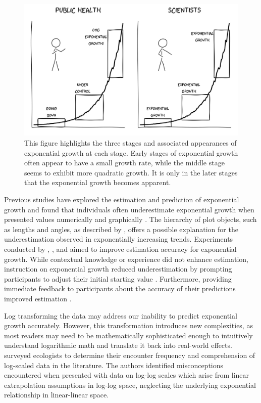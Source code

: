 \documentclass[12pt]{article}
\begin{document}
\begin{figure}[tbp]

{\centering \includegraphics[width=1\linewidth,]{images/exponential-stages-comic} 

}

\caption{This figure highlights the three stages and associated appearances of exponential growth at each stage. Early stages of exponential growth often appear to have a small growth rate, while the middle stage seems to exhibit more quadratic growth. It is only in the later stages that the exponential growth becomes apparent.}\label{fig:exponential-stages}
\end{figure}

Previous studies have explored the estimation and prediction of
exponential growth and found that individuals often underestimate
exponential growth when presented values numerically and graphically
\citep{wagenaar_misperception_1975}. The hierarchy of plot objects, such
as lengths and angles, as described by \citet{cleveland_graphical_1985},
offers a possible explanation for the underestimation observed in
exponentially increasing trends. Experiments conducted by
\citet{wagenaar_misperception_1975}, \citet{jones_polynomial_1977}, and
\citet{mackinnon_feedback_1991} aimed to improve estimation accuracy for
exponential growth. While contextual knowledge or experience did not
enhance estimation, instruction on exponential growth reduced
underestimation by prompting participants to adjust their initial
starting value
\citep{wagenaar_misperception_1975, jones_polynomial_1977}. Furthermore,
providing immediate feedback to participants about the accuracy of their
predictions improved estimation \citep{mackinnon_feedback_1991}.

Log transforming the data may address our inability to predict
exponential growth accurately. However, this transformation introduces
new complexities, as most readers may need to be mathematically
sophisticated enough to intuitively understand logarithmic math and
translate it back into real-world effects.
\citet{menge_logarithmic_2018} surveyed ecologists to determine their
encounter frequency and comprehension of log-scaled data in the
literature. The authors identified misconceptions encountered when
presented with data on log-log scales which arise from linear
extrapolation assumptions in log-log space, neglecting the underlying
exponential relationship in linear-linear space.
\end{document}
